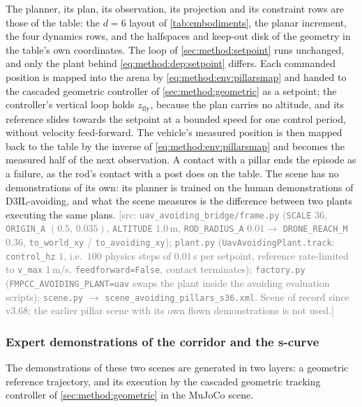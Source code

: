 \documentclass[headsepline,footsepline,footinclude=false,oneside,fontsize=11pt,paper=a4,listof=totoc,bibliography=totoc]{scrbook}
\theoremstyle{definition}
\theoremstyle{plain}
\theoremstyle{remark}
\newcommand{\sidx}[1]{_{\textrm{#1}}}
\newif\ifsubmission
\newcommand{\srcnote}[1]{\ifsubmission\else\textcolor{gray}{\footnotesize\textsf{[src: #1]}}\fi}
\begin{document}
The planner, its plan, its observation, its projection and its constraint rows are those of the table:
the $d = 6$ layout of \autoref{tab:embodiments}, the planar increment, the four dynamics rows, and the
halfspaces and keep-out disk of the geometry in the table's own coordinates. The loop of
\autoref{sec:method:setpoint} runs unchanged, and only the plant behind \eqref{eq:method:dep:setpoint}
differs. Each commanded position is mapped into the arena by \eqref{eq:method:env:pillarsmap} and handed
to the cascaded geometric controller of \autoref{sec:method:geometric} as a setpoint; the controller's
vertical loop holds $z\sidx{fly}$, because the plan carries no altitude, and its reference slides towards
the setpoint at a bounded speed for one control period, without velocity feed-forward. The vehicle's
measured position is then mapped back to the table by the inverse of \eqref{eq:method:env:pillarsmap}
and becomes the measured half of the next observation. A contact with a pillar ends the episode as a
failure, as the rod's contact with a post does on the table. The scene has no demonstrations of its own:
its planner is trained on the human demonstrations of D3IL-avoiding, and what the scene measures is the
difference between two plants executing the same plans.
\srcnote{\texttt{uav\_avoiding\_bridge/frame.py} (\texttt{SCALE} $36$, \texttt{ORIGIN\_A} $(0.5,\,0.035)$,
\texttt{ALTITUDE} $1.0$\,m, \texttt{ROD\_RADIUS\_A} $0.01 \to$ \texttt{DRONE\_REACH\_M} $0.36$,
\texttt{to\_world\_xy} / \texttt{to\_avoiding\_xy}); \texttt{plant.py} (\texttt{UavAvoidingPlant.track}:
\texttt{control\_hz} $1$, i.e.\ $100$ physics steps of $0.01$\,s per setpoint, reference rate-limited to
\texttt{v\_max} $1$\,m/s, \texttt{feedforward=False}, contact terminates); \texttt{factory.py}
(\texttt{FMPCC\_AVOIDING\_PLANT=uav} swaps the plant inside the avoiding evaluation scripts);
\texttt{scene.py} $\to$ \texttt{scene\_avoiding\_pillars\_s36.xml}. Scene of record since v3.68; the
earlier pillar scene with its own flown demonstrations is not used.}

\subsubsection*{Expert demonstrations of the corridor and the s-curve}

The demonstrations of these two scenes are generated in two layers: a geometric reference trajectory,
and its execution by the cascaded geometric tracking controller of \autoref{sec:method:geometric} in the
MuJoCo scene.
\end{document}
